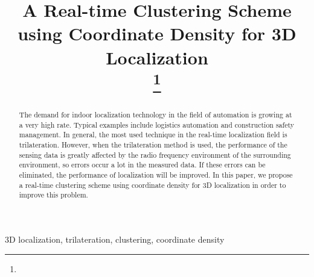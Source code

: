 \documentclass[conference]{IEEEtran}
\begin{document}
\title{A Real-time Clustering Scheme using Coordinate Density for 3D Localization\\
\thanks{}}

\author{
\and
{}
}

\maketitle

\begin{abstract}
The demand for indoor localization technology in the field of automation is growing at a very high rate. Typical examples include logistics automation and construction safety management. In general, the most used technique in the real-time localization field is trilateration. However, when the trilateration method is used, the performance of the sensing data is greatly affected by the radio frequency environment of the surrounding environment, so errors occur a lot in the measured data. If these errors can be eliminated, the performance of localization will be improved. In this paper, we propose a real-time clustering scheme using coordinate density for 3D localization in order to improve this problem.
\end{abstract}

\begin{IEEEkeywords}
3D localization, trilateration, clustering, coordinate density
\end{IEEEkeywords}
\end{document}
